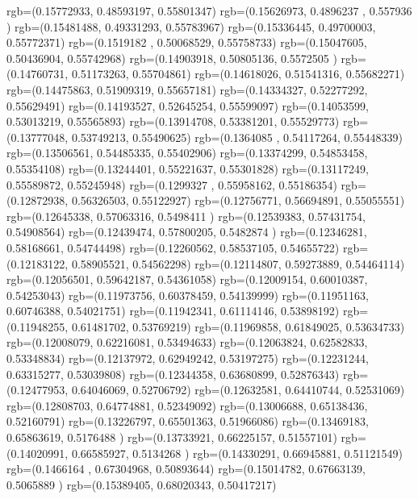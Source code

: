 {{{      rgb=(0.15772933,  0.48593197,  0.55801347)
      rgb=(0.15626973,  0.4896237 ,  0.557936  )
      rgb=(0.15481488,  0.49331293,  0.55783967)
      rgb=(0.15336445,  0.49700003,  0.55772371)
      rgb=(0.1519182 ,  0.50068529,  0.55758733)
      rgb=(0.15047605,  0.50436904,  0.55742968)
      rgb=(0.14903918,  0.50805136,  0.5572505 )
      rgb=(0.14760731,  0.51173263,  0.55704861)
      rgb=(0.14618026,  0.51541316,  0.55682271)
      rgb=(0.14475863,  0.51909319,  0.55657181)
      rgb=(0.14334327,  0.52277292,  0.55629491)
      rgb=(0.14193527,  0.52645254,  0.55599097)
      rgb=(0.14053599,  0.53013219,  0.55565893)
      rgb=(0.13914708,  0.53381201,  0.55529773)
      rgb=(0.13777048,  0.53749213,  0.55490625)
      rgb=(0.1364085 ,  0.54117264,  0.55448339)
      rgb=(0.13506561,  0.54485335,  0.55402906)
      rgb=(0.13374299,  0.54853458,  0.55354108)
      rgb=(0.13244401,  0.55221637,  0.55301828)
      rgb=(0.13117249,  0.55589872,  0.55245948)
      rgb=(0.1299327 ,  0.55958162,  0.55186354)
      rgb=(0.12872938,  0.56326503,  0.55122927)
      rgb=(0.12756771,  0.56694891,  0.55055551)
      rgb=(0.12645338,  0.57063316,  0.5498411 )
      rgb=(0.12539383,  0.57431754,  0.54908564)
      rgb=(0.12439474,  0.57800205,  0.5482874 )
      rgb=(0.12346281,  0.58168661,  0.54744498)
      rgb=(0.12260562,  0.58537105,  0.54655722)
      rgb=(0.12183122,  0.58905521,  0.54562298)
      rgb=(0.12114807,  0.59273889,  0.54464114)
      rgb=(0.12056501,  0.59642187,  0.54361058)
      rgb=(0.12009154,  0.60010387,  0.54253043)
      rgb=(0.11973756,  0.60378459,  0.54139999)
      rgb=(0.11951163,  0.60746388,  0.54021751)
      rgb=(0.11942341,  0.61114146,  0.53898192)
      rgb=(0.11948255,  0.61481702,  0.53769219)
      rgb=(0.11969858,  0.61849025,  0.53634733)
      rgb=(0.12008079,  0.62216081,  0.53494633)
      rgb=(0.12063824,  0.62582833,  0.53348834)
      rgb=(0.12137972,  0.62949242,  0.53197275)
      rgb=(0.12231244,  0.63315277,  0.53039808)
      rgb=(0.12344358,  0.63680899,  0.52876343)
      rgb=(0.12477953,  0.64046069,  0.52706792)
      rgb=(0.12632581,  0.64410744,  0.52531069)
      rgb=(0.12808703,  0.64774881,  0.52349092)
      rgb=(0.13006688,  0.65138436,  0.52160791)
      rgb=(0.13226797,  0.65501363,  0.51966086)
      rgb=(0.13469183,  0.65863619,  0.5176488 )
      rgb=(0.13733921,  0.66225157,  0.51557101)
      rgb=(0.14020991,  0.66585927,  0.5134268 )
      rgb=(0.14330291,  0.66945881,  0.51121549)
      rgb=(0.1466164 ,  0.67304968,  0.50893644)
      rgb=(0.15014782,  0.67663139,  0.5065889 )
      rgb=(0.15389405,  0.68020343,  0.50417217)
}}}
